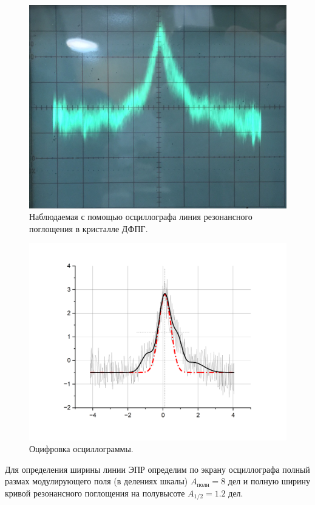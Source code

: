 \documentclass[a4paper,12pt]{article} %
\begin{document}
\medskip


\begin{figure}[h!]

\includegraphics[scale=0.25]{пик.jpg}
\caption{Наблюдаемая с помощью осциллографа линия резонансного поглощения в кристалле ДФПГ.} 
\end{figure}

\begin{figure}[h!]

\includegraphics[scale=0.6]{график1.png} 
\caption{Оцифровка осциллограммы.}
\end{figure}

\noindent Для определения ширины линии ЭПР определим по экрану осциллографа полный размах модулирующего поля (в делениях шкалы) $A_{полн} = 8 \text{ дел}$ и полную ширину кривой резонансного поглощения на полувысоте $A_{1/2} = 1.2 \text{ дел}$.
\end{document}
